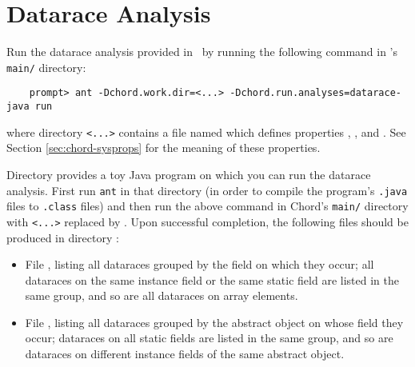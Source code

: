 \section{Datarace Analysis}
\label{sec:datarace}

Run the datarace analysis provided in \Chord\ by running the following command in \Chord's {\tt main/} directory:

\begin{verbatim}
    prompt> ant -Dchord.work.dir=<...> -Dchord.run.analyses=datarace-java run
\end{verbatim}

\noindent where directory {\tt <...>} contains a file named  which
defines properties , , and .
See Section \ref{sec:chord-sysprops} for the meaning of these properties.

Directory  provides a toy Java program on which you can run the datarace
analysis.
First run {\tt ant} in that directory (in order to compile the program's {\tt .java} files to
{\tt .class} files) and then run the above command in Chord's {\tt main/} directory
with {\tt <...>} replaced by .
Upon successful completion, the following files should be produced in directory
:

\begin{itemize}
\item
File , listing all dataraces grouped by the field on which they occur; all
dataraces on the same instance field or the same static field are listed in the same group, and so are
all dataraces on array elements.
\item
File , listing all dataraces grouped by the abstract object on whose field they occur;
dataraces on all static fields are listed in the same group, and so are dataraces on different
instance fields of the same abstract object.
\end{itemize}


